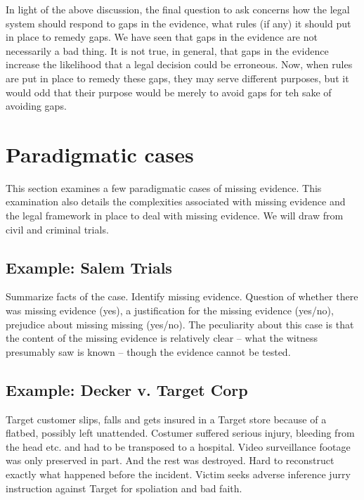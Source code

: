 \documentclass[
  10pt,
  dvipsnames,enabledeprecatedfontcommands]{scrartcl}
\begin{document}
In light of the above discussion, the final question to ask concerns how
the legal system should respond to gaps in the evidence, what rules (if
any) it should put in place to remedy gaps. We have seen that gaps in
the evidence are not necessarily a bad thing. It is not true, in
general, that gaps in the evidence increase the likelihood that a legal
decision could be erroneous. Now, when rules are put in place to remedy
these gaps, they may serve different purposes, but it would odd that
their purpose would be merely to avoid gaps for teh sake of avoiding
gaps.

\hypertarget{paradigmatic-cases}{%
\section{Paradigmatic cases}\label{paradigmatic-cases}}

This section examines a few paradigmatic cases of missing evidence. This
examination also details the complexities associated with missing
evidence and the legal framework in place to deal with missing evidence.
We will draw from civil and criminal trials.

\hypertarget{example-salem-trials}{%
\subsection{Example: Salem Trials}\label{example-salem-trials}}

Summarize facts of the case. Identify missing evidence. Question of
whether there was missing evidence (yes), a justification for the
missing evidence (yes/no), prejudice about missing missing (yes/no). The
peculiarity about this case is that the content of the missing evidence
is relatively clear -- what the witness presumably saw is known --
though the evidence cannot be tested.

\hypertarget{example-decker-v.-target-corp}{%
\subsection{Example: Decker v. Target
Corp}\label{example-decker-v.-target-corp}}

Target customer slips, falls and gets insured  in a
Target store because of a flatbed, possibly left unattended. Costumer
suffered serious injury, bleeding from the head etc. and had to be
transposed to a hospital. Video surveillance footage was only preserved
in part. And the rest was destroyed. Hard to reconstruct exactly what
happened before the incident. Victim seeks adverse inference jurry
instruction against Target for spoliation and bad faith.
\end{document}
